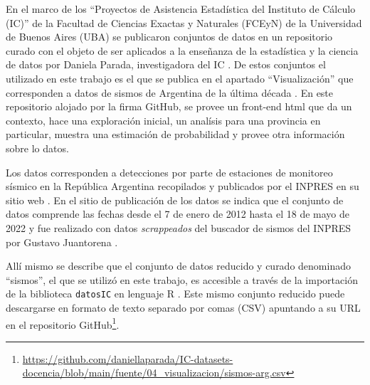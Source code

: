 \documentclass[a4paper]{report}
\begin{document}
En el marco de los ``Proyectos de Asistencia Estadística del Instituto de Cálculo (IC)'' de la Facultad de Ciencias Exactas y Naturales (FCEyN) de la Universidad de Buenos Aires (UBA) se publicaron conjuntos de datos en un repositorio curado con el objeto de ser aplicados a la enseñanza de la estadística y la ciencia de datos por Daniela Parada, investigadora del IC \cite{noauthor_ic-datasets-docencia_nodate}.
De estos conjuntos el utilizado en este trabajo es el que se publica en el apartado ``Visualización'' que corresponden a datos de sismos de Argentina de la última década \cite{daniela_parada_ic-datasets-docencia_nodate}. 
En este repositorio alojado por la firma GitHub, se provee un front-end html que da un contexto, hace una exploración inicial, un analísis para una provincia en particular, muestra una estimación de probabilidad y provee otra información sobre lo datos.

Los datos corresponden a detecciones por parte de estaciones de monitoreo sísmico en la República Argentina recopilados y publicados por el INPRES en su sitio web \cite{noauthor_buscador_nodate}.
En el sitio de publicación de los datos se indica que el conjunto de datos comprende las fechas desde el 7 de enero de 2012 hasta el 18 de mayo de 2022 y fue realizado con datos \emph{scrappeados} del buscador de sismos del INPRES por Gustavo Juantorena \cite[sección 4.1]{daniela_parada_ic-datasets-docencia_nodate}. 

Allí mismo se describe que el conjunto de datos reducido y curado denominado ``sismos'', el que se utilizó en este trabajo, es accesible a través de la importación de la biblioteca \texttt{datosIC} en lenguaje R  \cite[sección 5.1.1]{daniela_parada_ic-datasets-docencia_nodate}.
Este mismo conjunto reducido puede descargarse en formato de texto separado por comas (CSV) apuntando a su URL en el repositorio GitHub\footnote{\url{https://github.com/daniellaparada/IC-datasets-docencia/blob/main/fuente/04_visualizacion/sismos-arg.csv}}.
\end{document}
